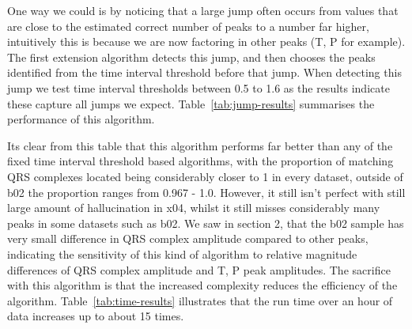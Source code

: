 One way we could is by noticing that a large jump often occurs from values that are close to the estimated correct
number of peaks to a number far higher, intuitively this is because we are now factoring in other peaks (T, P for example).
The first extension algorithm detects this jump, and then chooses the peaks identified from the 
time interval threshold before that jump. When detecting this jump we test time interval thresholds between 
0.5 to 1.6 as the results indicate these capture all jumps we expect. Table~\ref{tab:jump-results} summarises the performance of this 
algorithm. 
\begin{table}[H]
    \centering
    \caption{Performance of the jump based algorithm.}
    \label{tab:jump-results}
\end{table}
Its clear from this table that this algorithm performs far better than any of 
the fixed time interval threshold based algorithms, with the proportion of matching QRS complexes located being considerably closer 
to 1 in every dataset, outside of b02 the proportion ranges from 0.967 - 1.0. 
However, it still isn't perfect with still large amount of hallucination in x04, whilst it still
misses considerably many peaks in some datasets such as b02. We saw in section 2, that the b02 sample has very small 
difference in QRS complex amplitude compared to other peaks, indicating the sensitivity of this kind of algorithm to relative 
magnitude differences of QRS complex amplitude and T, P peak amplitudes.
The sacrifice with this algorithm is that the increased complexity reduces the efficiency 
of the algorithm. Table~\ref{tab:time-results} illustrates that the run time over an hour of data increases 
up to about 15 times. 
\begin{table}[H]
    \centering
    \caption{Time Comparison (sec) for running each algorithm over an hour of data}
    \label{tab:time-results}
\end{table}

